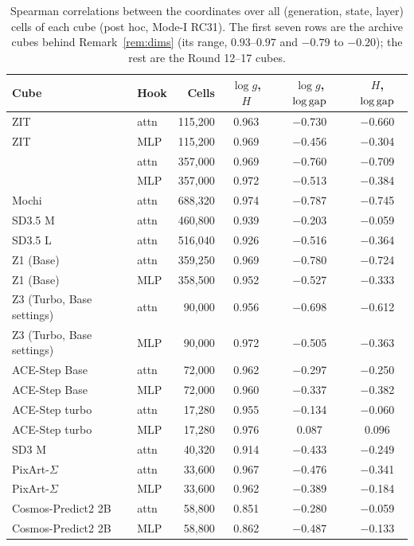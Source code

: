 \begin{table}[htbp]
\centering\small
\caption{Spearman correlations between the coordinates over all (generation, state, layer) cells of each cube (post hoc, Mode-I RC31). The first seven rows are the archive cubes behind Remark~\ref{rem:dims} (its range, $0.93$--$0.97$ and $-0.79$ to $-0.20$); the rest are the Round 12--17 cubes.}
\label{tab:collin}
\begin{tabular}{llrccc}
\toprule
Cube & Hook & Cells & $\log g$, $H$ & $\log g$, $\log\mathrm{gap}$ & $H$, $\log\mathrm{gap}$\\
\midrule
ZIT & attn & 115{,}200 & 0.963 & $-$0.730 & $-$0.660\\
ZIT & MLP & 115{,}200 & 0.969 & $-$0.456 & $-$0.304\\
\TT{} & attn & 357{,}000 & 0.969 & $-$0.760 & $-$0.709\\
\TT{} & MLP & 357{,}000 & 0.972 & $-$0.513 & $-$0.384\\
Mochi & attn & 688{,}320 & 0.974 & $-$0.787 & $-$0.745\\
SD3.5 M & attn & 460{,}800 & 0.939 & $-$0.203 & $-$0.059\\
SD3.5 L & attn & 516{,}040 & 0.926 & $-$0.516 & $-$0.364\\
Z1 (Base) & attn & 359{,}250 & 0.969 & $-$0.780 & $-$0.724\\
Z1 (Base) & MLP & 358{,}500 & 0.952 & $-$0.527 & $-$0.333\\
Z3 (Turbo{,} Base settings) & attn & 90{,}000 & 0.956 & $-$0.698 & $-$0.612\\
Z3 (Turbo{,} Base settings) & MLP & 90{,}000 & 0.972 & $-$0.505 & $-$0.363\\
ACE-Step Base & attn & 72{,}000 & 0.962 & $-$0.297 & $-$0.250\\
ACE-Step Base & MLP & 72{,}000 & 0.960 & $-$0.337 & $-$0.382\\
ACE-Step turbo & attn & 17{,}280 & 0.955 & $-$0.134 & $-$0.060\\
ACE-Step turbo & MLP & 17{,}280 & 0.976 & 0.087 & 0.096\\
SD3 M & attn & 40{,}320 & 0.914 & $-$0.433 & $-$0.249\\
PixArt-$\Sigma$ & attn & 33{,}600 & 0.967 & $-$0.476 & $-$0.341\\
PixArt-$\Sigma$ & MLP & 33{,}600 & 0.962 & $-$0.389 & $-$0.184\\
Cosmos-Predict2 2B & attn & 58{,}800 & 0.851 & $-$0.280 & $-$0.059\\
Cosmos-Predict2 2B & MLP & 58{,}800 & 0.862 & $-$0.487 & $-$0.133\\
\bottomrule
\end{tabular}
\end{table}

